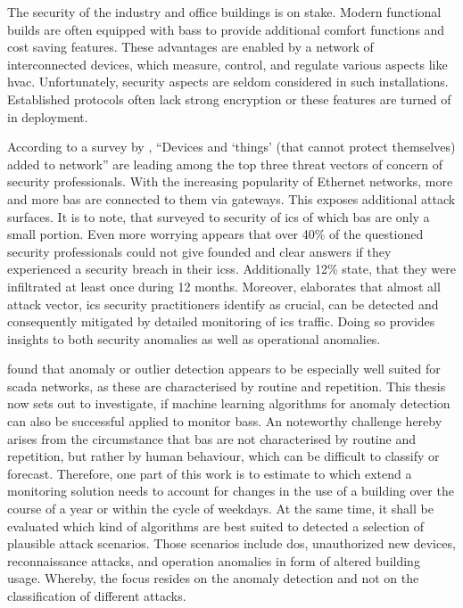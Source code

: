 
The security of the industry and office buildings is on stake.
Modern functional builds are often equipped with \glspl{bas} to provide additional comfort functions and cost saving features.
These advantages are enabled by a network of interconnected devices, which measure, control, and regulate various aspects like \gls{hvac}.
Unfortunately, security aspects are seldom considered in such installations. \parencite{Brandstetter2017}
Established protocols often lack strong encryption or these features are turned of in deployment.

According to a survey by \textcite{Gregory-Brown2017}, \enquote{Devices and \enquote{things} (that cannot protect themselves) added to network} are leading among the top three threat vectors of concern of security professionals.
With the increasing popularity of Ethernet networks, more and more \gls{bas} are connected to them via gateways. This exposes additional attack surfaces.
It is to note, that \textcite{Gregory-Brown2017} surveyed to security of \gls{ics} of which \gls{bas} are only a small portion.
Even more worrying appears that over 40\% of the questioned security professionals could not give founded and clear answers if they experienced a security breach in their \glspl{ics}. Additionally 12\% state, that they were infiltrated at least once during 12 months. \parencite[p.~13]{Gregory-Brown2017}
Moreover, \textcite{Gregory-Brown2017} elaborates that almost all attack vector, \gls{ics} security practitioners identify as crucial, can be detected and consequently mitigated by detailed monitoring of \gls{ics} traffic. Doing so provides insights to both security anomalies as well as operational anomalies. 

\textcite{Yang2006} found that anomaly or outlier detection appears to be especially well suited for \gls{scada} networks, as these are characterised by routine and repetition.
This thesis now sets out to investigate, if machine learning algorithms for anomaly detection can also be successful applied to monitor \glspl{bas}. An noteworthy challenge hereby arises from the circumstance that \gls{bas} are not characterised by routine and repetition, but rather by human behaviour, which can be difficult to classify or forecast.
Therefore, one part of this work is to estimate to which extend a monitoring solution needs to account for changes in the use of a building over the course of a year or within the cycle of weekdays.
At the same time, it shall be evaluated which kind of algorithms are best suited to detected a selection of plausible attack scenarios.
Those scenarios include \gls{dos}, unauthorized new devices, reconnaissance attacks, and operation anomalies in form of altered building usage.
Whereby, the focus resides on the anomaly detection and not on the classification of different attacks.

